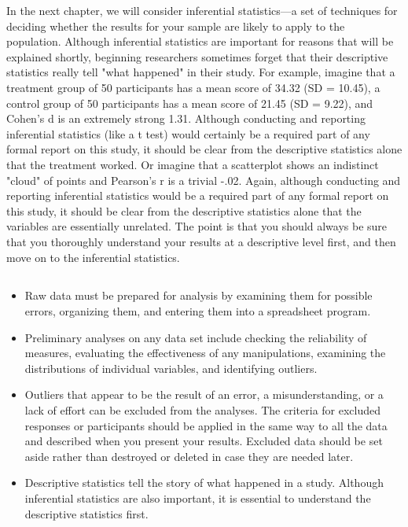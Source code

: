 In the next chapter, we will consider inferential statistics---a set of techniques for deciding whether the results for your sample are likely to apply to the population. Although inferential statistics are important for reasons that will be explained shortly, beginning researchers sometimes forget that their descriptive statistics really tell "what happened" in their study. For example, imagine that a treatment group of 50 participants has a mean score of 34.32 (SD = 10.45), a control group of 50 participants has a mean score of 21.45 (SD = 9.22), and Cohen's d is an extremely strong 1.31. Although conducting and reporting inferential statistics (like a t test) would certainly be a required part of any formal report on this study, it should be clear from the descriptive statistics alone that the treatment worked. Or imagine that a scatterplot shows an indistinct "cloud" of points and Pearson's r is a trivial -.02. Again, although conducting and reporting inferential statistics would be a required part of any formal report on this study, it should be clear from the descriptive statistics alone that the variables are essentially unrelated. The point is that you should always be sure that you thoroughly understand your results at a descriptive level first, and then move on to the inferential statistics.


\subsection{}
\begin{fullwidth}
\begin{itemize}
\item Raw data must be prepared for analysis by examining them for possible errors, organizing them, and entering them into a spreadsheet program.

\item Preliminary analyses on any data set include checking the reliability of measures, evaluating the effectiveness of any manipulations, examining the distributions of individual variables, and identifying outliers.

\item Outliers that appear to be the result of an error, a misunderstanding, or a lack of effort can be excluded from the analyses. The criteria for excluded responses or participants should be applied in the same way to all the data and described when you present your results. Excluded data should be set aside rather than destroyed or deleted in case they are needed later.

\item Descriptive statistics tell the story of what happened in a study. Although inferential statistics are also important, it is essential to understand the descriptive statistics first.

\end{itemize}
\end{fullwidth}

